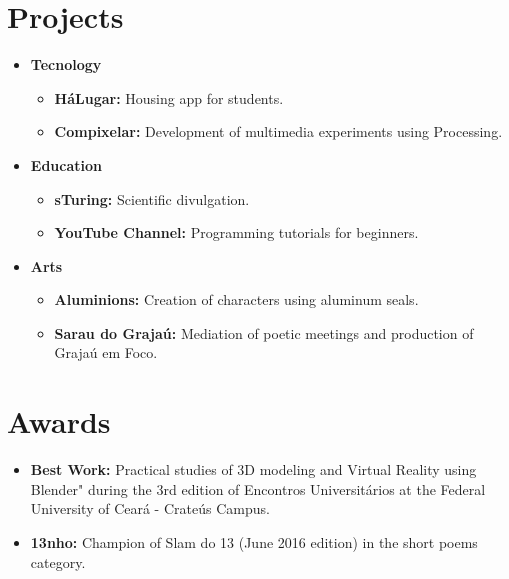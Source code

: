 \documentclass[letterpaper,11pt]{article}
\newcommand{\resumeItem}[2]{
  \item\small{
    \textbf{#1}{ #2 \vspace{-2pt}}
  }
}
\newcommand{\resumeSubItem}[2]{\resumeItem{#1}{#2}\vspace{-4pt}}
\newcommand{\resumeSubHeadingListStart}{\begin{itemize}[leftmargin=*]}
\newcommand{\resumeSubHeadingListEnd}{\end{itemize}}
\begin{document}
\section{\faRocket \hspace{0.2cm} Projects}
  \resumeSubHeadingListStart
    \resumeSubItem{Tecnology}{}
        \begin{itemize}
            \item \textbf{HáLugar:} Housing app for students. \href{https://play.google.com/store/apps/details?id=br.ufc.crateus.halugar}{\faInfoCircle}
            \item \textbf{Compixelar:} Development of multimedia experiments using Processing. \href{https://medium.com/@danielhbrito}{\faInfoCircle}
        \end{itemize}
    \resumeSubItem{Education}{}
        \begin{itemize}
            \item \textbf{sTuring:} Scientific divulgation. \href{https://www.instagram.com/sturing.compsci/}{\faInfoCircle}
            \item \textbf{YouTube Channel:}  Programming tutorials for beginners. \href{https://www.youtube.com/channel/UC4y3uq1d7MKDYs1LbI44Vng}{\faInfoCircle}
        \end{itemize}
    \resumeSubItem{Arts}{}
        \begin{itemize}
            \item \textbf{Aluminions:} Creation of characters using aluminum seals. \href{https://www.instagram.com/aluminions.13/}{\faInfoCircle}
            \item \textbf{Sarau do Grajaú:} Mediation of poetic meetings and production of Grajaú em Foco. \href{https://www.facebook.com/Sarau-do-Graja\%C3\%BA-191479077716775}{\faInfoCircle} 
        \end{itemize}
  \resumeSubHeadingListEnd

\section{\faTrophy \hspace{0.2cm} Awards}
  \resumeSubHeadingListStart
    \resumeSubItem{Best Work:}
      {Practical studies of 3D modeling and Virtual Reality using Blender" during the 3rd edition of Encontros Universitários at the Federal University of Ceará - Crateús Campus.}
    \resumeSubItem{13nho:}
      {Champion of Slam do 13 (June 2016 edition) in the short poems category.}
    \vspace{0.3cm}
  \resumeSubHeadingListEnd
\end{document}
